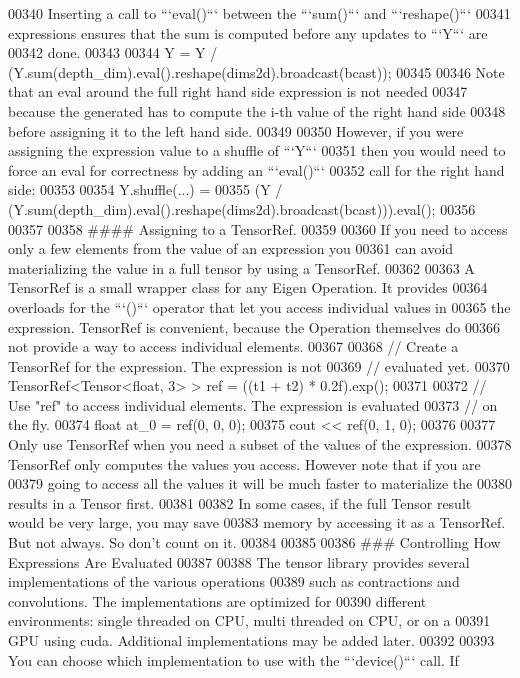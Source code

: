 \begin{DoxyCode}
00340 Inserting a call to ```eval()``` between the ```sum()``` and ```reshape()```
00341 expressions ensures that the sum is computed before any updates to ```Y``` are
00342 done.
00343 
00344      Y = Y / (Y.sum(depth\_dim).eval().reshape(dims2d).broadcast(bcast));
00345 
00346 Note that an eval around the full right hand side expression is not needed
00347 because the generated has to compute the i-th value of the right hand side
00348 before assigning it to the left hand side.
00349 
00350 However, if you were assigning the expression value to a shuffle of ```Y```
00351 then you would need to force an eval for correctness by adding an ```eval()```
00352 call for the right hand side:
00353 
00354      Y.shuffle(...) =
00355         (Y / (Y.sum(depth\_dim).eval().reshape(dims2d).broadcast(bcast))).eval();
00356 
00357 
00358 #### Assigning to a TensorRef.
00359 
00360 If you need to access only a few elements from the value of an expression you
00361 can avoid materializing the value in a full tensor by using a TensorRef.
00362 
00363 A TensorRef is a small wrapper class for any Eigen Operation.  It provides
00364 overloads for the ```()``` operator that let you access individual values in
00365 the expression.  TensorRef is convenient, because the Operation themselves do
00366 not provide a way to access individual elements.
00367 
00368     // Create a TensorRef for the expression.  The expression is not
00369     // evaluated yet.
00370     TensorRef<Tensor<float, 3> > ref = ((t1 + t2) * 0.2f).exp();
00371 
00372     // Use "ref" to access individual elements.  The expression is evaluated
00373     // on the fly.
00374     float at\_0 = ref(0, 0, 0);
00375     cout << ref(0, 1, 0);
00376 
00377 Only use TensorRef when you need a subset of the values of the expression.
00378 TensorRef only computes the values you access.  However note that if you are
00379 going to access all the values it will be much faster to materialize the
00380 results in a Tensor first.
00381 
00382 In some cases, if the full Tensor result would be very large, you may save
00383 memory by accessing it as a TensorRef.  But not always.  So don't count on it.
00384 
00385 
00386 ### Controlling How Expressions Are Evaluated
00387 
00388 The tensor library provides several implementations of the various operations
00389 such as contractions and convolutions.  The implementations are optimized for
00390 different environments: single threaded on CPU, multi threaded on CPU, or on a
00391 GPU using cuda.  Additional implementations may be added later.
00392 
00393 You can choose which implementation to use with the ```device()``` call.  If

\end{DoxyCode}
